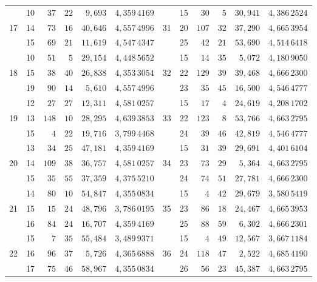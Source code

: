 \begin{center}
\begin{tabular}{|c|c|r@{\;}r@{\;}r|c||c|c|r@{\;}r@{\;}r|c|}
 & 10 & $37$ & $22$ & $9{,}693$ & $4{,}359\,4169$ &  & 15 & $30$ & $5$ & $30{,}941$ & $4{,}386\,2524$\\
17 & 14 & $73$ & $16$ & $40{,}646$ & $4{,}557\,4996$ & 31 & 20 & $107$ & $32$ & $37{,}290$ & $4{,}665\,3954$\\
 & 15 & $69$ & $21$ & $11{,}619$ & $4{,}547\,4347$ &  & 25 & $42$ & $21$ & $53{,}690$ & $4{,}514\,6418$\\[3pt]
 & 10 & $51$ & $5$ & $29{,}154$ & $4{,}448\,5652$ &  & 15 & $14$ & $35$ & $5{,}072$ & $4{,}180\,9050$\\
18 & 15 & $38$ & $40$ & $26{,}838$ & $4{,}353\,3054$ & 32 & 22 & $129$ & $39$ & $39{,}468$ & $4{,}666\,2300$\\
 & 19 & $90$ & $14$ & $5{,}610$ & $4{,}557\,4996$ &  & 23 & $35$ & $45$ & $16{,}500$ & $4{,}546\,4777$\\[3pt]
 & 12 & $27$ & $27$ & $12{,}311$ & $4{,}581\,0257$ &  & 15 & $17$ & $4$ & $24{,}619$ & $4{,}208\,1702$\\
19 & 13 & $148$ & $10$ & $28{,}295$ & $4{,}639\,3853$ & 33 & 22 & $123$ & $8$ & $53{,}766$ & $4{,}663\,2795$\\
 & 15 & $4$ & $22$ & $19{,}716$ & $3{,}799\,4468$ &  & 24 & $39$ & $46$ & $42{,}819$ & $4{,}546\,4777$\\[3pt]
 & 13 & $34$ & $25$ & $47{,}181$ & $4{,}359\,4169$ &  & 15 & $31$ & $39$ & $29{,}691$ & $4{,}401\,6104$\\
20 & 14 & $109$ & $38$ & $36{,}757$ & $4{,}581\,0257$ & 34 & 23 & $73$ & $29$ & $5{,}364$ & $4{,}663\,2795$\\
 & 15 & $35$ & $55$ & $37{,}359$ & $4{,}375\,5210$ &  & 24 & $74$ & $51$ & $27{,}781$ & $4{,}666\,2300$\\[3pt]
 & 14 & $80$ & $10$ & $54{,}847$ & $4{,}355\,0834$ &  & 15 & $4$ & $42$ & $29{,}679$ & $3{,}580\,5419$\\
21 & 15 & $15$ & $24$ & $48{,}796$ & $3{,}786\,0195$ & 35 & 23 & $86$ & $18$ & $24{,}467$ & $4{,}665\,3953$\\
 & 16 & $84$ & $24$ & $16{,}707$ & $4{,}359\,4169$ &  & 25 & $88$ & $59$ & $6{,}302$ & $4{,}666\,2301$\\[3pt]
 & 15 & $7$ & $35$ & $55{,}484$ & $3{,}489\,9371$ &  & 15 & $4$ & $49$ & $12{,}567$ & $3{,}667\,1184$\\
22 & 16 & $96$ & $37$ & $5{,}726$ & $4{,}365\,6888$ & 36 & 24 & $118$ & $47$ & $2{,}522$ & $4{,}685\,4190$\\
 & 17 & $75$ & $46$ & $58{,}967$ & $4{,}355\,0834$ &  & 26 & $56$ & $23$ & $45{,}387$ & $4{,}663\,2795$\\[3pt]

\end{tabular}
\end{center}
